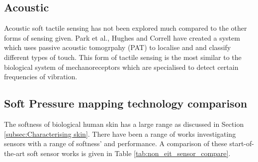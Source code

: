 \subsection{Acoustic}
Acoustic soft tactile sensing has not been explored much compared to the other forms of sensing given. Park et al., Hughes and Correll \cite{Park2022,Hughes2015} have created a system which uses passive acoustic tomogrpahy (PAT) to localise and and classify different types of touch. This form of tactile sensing is the most similar to the biological system of mechanoreceptors which are specialised to detect certain frequencies of vibration.


\subsection{Soft Pressure mapping technology comparison}
The softness of biological human skin has a large range as discussed in Section \ref{subsec:Characterising skin}. There have been a range of works investigating sensors with a range of softness' and performance. A comparison of these start-of-the-art soft sensor works is given in Table \ref{tab:non_eit_sensor_compare}.
